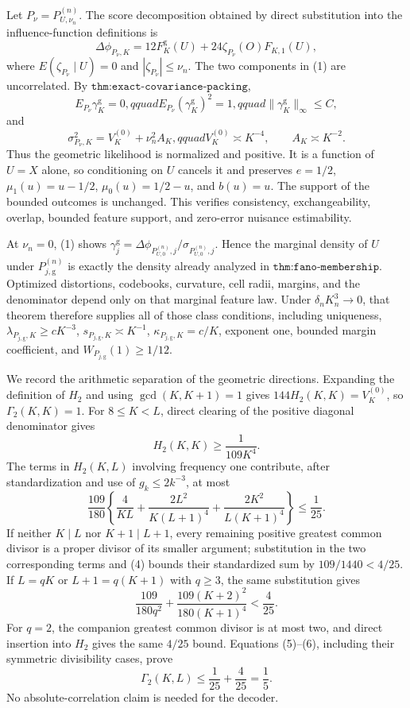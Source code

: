Let \(P_\nu=P_{U,\nu_n}^{(n)}\).  The score decomposition obtained by direct substitution into the influence-function definitions is
\[
 \Delta\phi_{P_\nu,K}
 =12F^{\mathrm g}_K(U)+24\zeta_{P_\nu}(O)F_{K,1}(U),                                    \tag{1}
\]
where \(E(\zeta_{P_\nu}\mid U)=0\) and \(|\zeta_{P_\nu}|\leq\nu_n\).  The two components in (1) are uncorrelated.  By \(\texttt{thm:exact-covariance-packing}\),
\[
 E_{P_\nu}\gamma_K^{\mathrm g}=0,qquad
 E_{P_\nu}(\gamma_K^{\mathrm g})^2=1,qquad
 \|\gamma_K^{\mathrm g}\|_\infty\leq C,                                               \tag{2}
\]
and
\[
 \sigma_{P_\nu,K}^2=V_K^{(0)}+\nu_n^2A_K,qquad
 V_K^{(0)}\asymp K^{-4},\qquad A_K\asymp K^{-2}.                                       \tag{3}
\]
Thus the geometric likelihood is normalized and positive.  It is a function of \(U=X\) alone, so conditioning on \(U\) cancels it and preserves \(e=1/2\), \(\mu_1(u)=u-1/2\), \(\mu_0(u)=1/2-u\), and \(b(u)=u\).  The support of the bounded outcomes is unchanged.  This verifies consistency, exchangeability, overlap, bounded feature support, and zero-error nuisance estimability.

At \(\nu_n=0\), (1) shows \(\gamma_j^{\mathrm g}=\Delta\phi_{P_{U,0}^{(n)},j}/\sigma_{P_{U,0}^{(n)},j}\).  Hence the marginal density of \(U\) under \(P_{j,\mathrm g}^{(n)}\) is exactly the density already analyzed in \(\texttt{thm:fano-membership}\).  Optimized distortions, codebooks, curvature, cell radii, margins, and the denominator depend only on that marginal feature law.  Under \(\delta_nK_n^3\to0\), that theorem therefore supplies all of those class conditions, including uniqueness, \(\lambda_{P_{j,\mathrm g},K}\geq cK^{-3}\), \(s_{P_{j,\mathrm g},K}\asymp K^{-1}\), \(\kappa_{P_{j,\mathrm g},K}=c/K\), exponent one, bounded margin coefficient, and \(W_{P_{j,\mathrm g}}(1)\geq1/12\).

We record the arithmetic separation of the geometric directions.  Expanding the definition of \(H_2\) and using \(\gcd(K,K+1)=1\) gives \(144H_2(K,K)=V_K^{(0)}\), so \(\Gamma_2(K,K)=1\).  For \(8\leq K<L\), direct clearing of the positive diagonal denominator gives
\[
 H_2(K,K)\geq\frac1{109K^4}.                                                            \tag{4}
\]
The terms in \(H_2(K,L)\) involving frequency one contribute, after standardization and use of \(g_k\leq2k^{-3}\), at most
\[
 \frac{109}{180}\left\{\frac4{KL}
 +\frac{2L^2}{K(L+1)^4}+\frac{2K^2}{L(K+1)^4}\right\}\leq\frac1{25}.                   \tag{5}
\]
If neither \(K\mid L\) nor \(K+1\mid L+1\), every remaining positive greatest common divisor is a proper divisor of its smaller argument; substitution in the two corresponding terms and (4) bounds their standardized sum by \(109/1440<4/25\).  If \(L=qK\) or \(L+1=q(K+1)\) with \(q\geq3\), the same substitution gives
\[
 \frac{109}{180q^2}+\frac{109(K+2)^2}{180(K+1)^4}<\frac4{25}.                            \tag{6}
\]
For \(q=2\), the companion greatest common divisor is at most two, and direct insertion into \(H_2\) gives the same \(4/25\) bound.  Equations (5)--(6), including their symmetric divisibility cases, prove
\[
 \Gamma_2(K,L)\leq\frac1{25}+\frac4{25}=\frac15.                                       \tag{7}
\]
No absolute-correlation claim is needed for the decoder.

